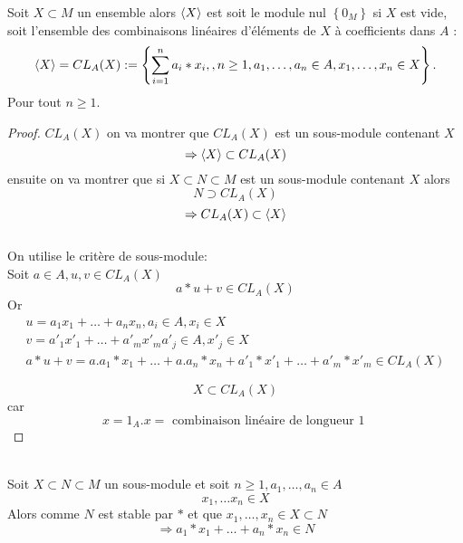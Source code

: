 \documentclass[../main.tex]{subfiles}
\begin{document}
\begin{thm}
	Soit $X\subset M$ un ensemble alors $\left\langle X\right\rangle$ est soit le module nul $ \left\{ 0_M \right\} $ si $X$ est vide, soit l'ensemble des combinaisons linéaires d'éléments de $X$ à coefficients dans $A$ :
	\[ 
		\left\langle X\right\rangle = CL_A(X) := \left\{ \sum_{i=1}^{ n}a_i \ast x_i,, n\geq 1, a_1,\ldots,a_n \in A, x_1,\ldots,x_n \in X \right\} .
	\]
	Pour tout $n\geq 1$.
	
\end{thm}
\begin{proof}
	$CL_A(X)$ on va montrer que $CL_A(X)$ est un sous-module contenant $X$ 
	\[ 
		\Rightarrow \left\langle X\right\rangle \subset CL_A(X)
	\]
	ensuite on va montrer que si $X\subset N \subset M$ est un sous-module contenant $X$ alors
	\[ 
		N \supset CL_A(X)
	\]
	\[ 
		\Rightarrow CL_A(X) \subset \left\langle X\right\rangle
	\]
\hr\\
On utilise le critère de sous-module:\\
Soit $a \in A, u,v \in CL_A(X)$
\[ 
	a\ast u + v \in CL_A(X)
\]
Or
\begin{align*}
u= a_1x_1+ \ldots + a_n x_n, a_i \in  A, x_i \in X\\
v= a'_1x'_1+ \ldots + a'_m x'_m a'_j \in A, x'_j \in X\\
a\ast u +v = a.a_1\ast x_1 + \ldots + a.a_n\ast x_n + a'_1 \ast x'_1 + \ldots + a'_m \ast x'_m \in CL_{A} ( X)
\end{align*}

\[ 
	X\subset CL_A(X)
\]
car 
\[ 
x=1_A. x = \text{ combinaison linéaire de longueur 1 } 
\]

\end{proof}


\hr\\
Soit $X\subset N\subset M$ un sous-module et soit $n\geq 1, a_1,\ldots,a_n \in A$
\[ 
x_1,\ldots x_n\in X
\]
Alors comme $N$ est stable par $\ast$ et que $x_1,\ldots,x_n\in X \subset N$ 
\[ 
\Rightarrow a_1\ast x_1 + \ldots + a_n \ast x_n \in N
\]
\end{document}
